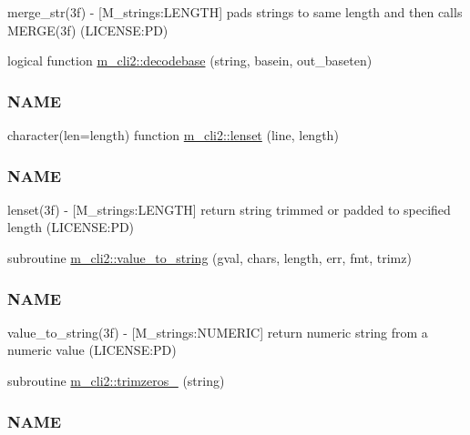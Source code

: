 \begin{DoxyCompactItemize}
\begin{DoxyCompactList}
merge\+\_\+str(3f) -\/ \mbox{[}M\+\_\+strings\+:L\+E\+N\+G\+TH\mbox{]} pads strings to same length and then calls M\+E\+R\+G\+E(3f) (L\+I\+C\+E\+N\+SE\+:PD) \end{DoxyCompactList}\item 
logical function \mbox{\hyperlink{namespacem__cli2_a1029304d495b2bf791e03cfab5983bbb}{m\+\_\+cli2\+::decodebase}} (string, basein, out\+\_\+baseten)
\begin{DoxyCompactList}\small\item\em \subsubsection*{N\+A\+ME}\end{DoxyCompactList}\item 
character(len=length) function \mbox{\hyperlink{namespacem__cli2_ad13853611abfee00d40ffa020662ec8a}{m\+\_\+cli2\+::lenset}} (line, length)
\begin{DoxyCompactList}\small\item\em \subsubsection*{N\+A\+ME}

lenset(3f) -\/ \mbox{[}M\+\_\+strings\+:L\+E\+N\+G\+TH\mbox{]} return string trimmed or padded to specified length (L\+I\+C\+E\+N\+SE\+:PD) \end{DoxyCompactList}\item 
subroutine \mbox{\hyperlink{namespacem__cli2_a1bbcefd886dabb0286e2cb14ab54034f}{m\+\_\+cli2\+::value\+\_\+to\+\_\+string}} (gval, chars, length, err, fmt, trimz)
\begin{DoxyCompactList}\small\item\em \subsubsection*{N\+A\+ME}

value\+\_\+to\+\_\+string(3f) -\/ \mbox{[}M\+\_\+strings\+:N\+U\+M\+E\+R\+IC\mbox{]} return numeric string from a numeric value (L\+I\+C\+E\+N\+SE\+:PD) \end{DoxyCompactList}\item 
subroutine \mbox{\hyperlink{namespacem__cli2_a770a66475094fd80493d46498de1ebf7}{m\+\_\+cli2\+::trimzeros\+\_\+}} (string)
\begin{DoxyCompactList}\small\item\em \subsubsection*{N\+A\+ME}


\end{DoxyCompactList}
\end{DoxyCompactItemize}

